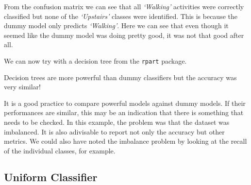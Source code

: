 \documentclass[
  11pt,
]{krantz}
\makeatletter
\newenvironment{Shaded}{\begin{snugshade}}{\end{snugshade}}
\newcommand{\AttributeTok}[1]{\textcolor[rgb]{0.61,0.61,0.61}{#1}}
\newcommand{\CommentTok}[1]{\textcolor[rgb]{0.37,0.37,0.37}{\textit{#1}}}
\newcommand{\DocumentationTok}[1]{\textcolor[rgb]{0.37,0.37,0.37}{\textbf{\textit{#1}}}}
\newcommand{\FunctionTok}[1]{\textcolor[rgb]{0,0,0}{#1}}
\newcommand{\NormalTok}[1]{#1}
\newcommand{\OtherTok}[1]{\textcolor[rgb]{0.37,0.37,0.37}{#1}}
\newcommand{\SpecialCharTok}[1]{\textcolor[rgb]{0,0,0}{#1}}
\newcommand{\StringTok}[1]{\textcolor[rgb]{0.5,0.5,0.5}{#1}}
\newenvironment{kframe}{%
\medskip{}
\setlength{\fboxsep}{.8em}
 \def\at@end@of@kframe{}%
 \ifinner\ifhmode%
  \def\at@end@of@kframe{\end{minipage}}%
  \begin{minipage}{\columnwidth}%
 \fi\fi%
 \def\FrameCommand##1{\hskip\@totalleftmargin \hskip-\fboxsep
 \colorbox{shadecolor}{##1}\hskip-\fboxsep
     \hskip-\linewidth \hskip-\@totalleftmargin \hskip\columnwidth}%
 \MakeFramed {\advance\hsize-\width
   \@totalleftmargin\z@ \linewidth\hsize
   \@setminipage}}%
 {\par\unskip\endMakeFramed%
 \at@end@of@kframe}
\newenvironment{rmdblock}[1]
  {
  \begin{itemize}
  \renewcommand{\labelitemi}{
    \raisebox{-.7\height}[0pt][0pt]{
      {\setkeys{Gin}{width=3em,keepaspectratio}\texttt{[image: images/icons/\#1]}}
    }
  }
  \setlength{\fboxsep}{1em}
  \begin{kframe}
  \item
  }
  {
  \end{kframe}
  \end{itemize}
  }
\newenvironment{rmdgoodpractice}
  {\begin{rmdblock}{goodpractice}}
  {\end{rmdblock}}
\makeatother
\begin{document}
From the confusion matrix we can see that all \emph{`Walking'} activities were correctly classified but none of the \emph{`Upstairs'} classes were identified. This is because the dummy model only predicts \emph{`Walking'}. Here we can see that even though it seemed like the dummy model was doing pretty good, it was not that good after all.

We can now try with a decision tree from the \texttt{rpart} package.

\begin{Shaded}
\end{Shaded}

Decision trees are more powerful than dummy classifiers but the accuracy was very similar!

\begin{rmdgoodpractice}
It is a good practice to compare powerful models against dummy models. If their performances are similar, this may be an indication that there is something that needs to be checked. In this example, the problem was that the dataset was imbalanced. It is also adivisable to report not only the accuracy but other metrics. We could also have noted the imbalance problem by looking at the recall of the individual classes, for example.
\end{rmdgoodpractice}

\hypertarget{uniform-classifier}{%
\subsection{Uniform Classifier}\label{uniform-classifier}}
\end{document}
